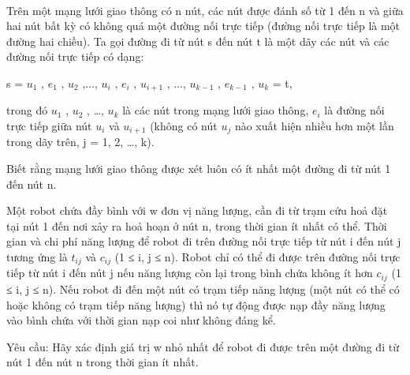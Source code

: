  

Trên một mạng lưới giao thông có n nút, các nút được đánh số từ 1 đến n và giữa hai nút bất kỳ có không quá một đường nối trực tiếp (đường nối trực tiếp là một đường hai chiều). Ta gọi đường đi từ nút s đến nút t là một dãy các nút và các đường nối trực tiếp có dạng:

s = $u_{1}$ , $e_{1}$ , $u_{2}$ ,..., $u_{i}$ , $e_{i}$ , $u_{i+1}$ , ..., $u_{k-1}$ , $e_{k-1}$ , $u_{k}$ = t,

trong đó $u_{1}$ , $u_{2}$ , …, $u_{k}$ là các nút trong mạng lưới giao thông, $e_{i}$ là đường nối trực tiếp giữa nút $u_{i}$ và $u_{i+1}$ (không có nút $u_{j}$ nào xuất hiện nhiều hơn một lần trong dãy trên, j = 1, 2, …, k).

Biết rằng mạng lưới giao thông được xét luôn có ít nhất một đường đi từ nút 1 đến nút n.

Một robot chứa đầy bình với w đơn vị năng lượng, cần đi từ trạm cứu hoả đặt tại nút 1 đến nơi xảy ra hoả hoạn ở nút n, trong thời gian ít nhất có thể. Thời gian và chi phí năng lượng để robot đi trên đường nối trực tiếp từ nút i đến nút j tương ứng là $t_{ij}$ và $c_{ij}$ (1 ≤ i, j ≤ n). Robot chỉ có thể đi được trên đường nối trực tiếp từ nút i đến nút j nếu năng lượng còn lại trong bình chứa không ít hơn $c_{ij}$ (1 ≤ i, j ≤ n). Nếu robot đi đến một nút có trạm tiếp năng lượng (một nút có thể có hoặc không có trạm tiếp năng lượng) thì nó tự động được nạp đầy năng lượng vào bình chứa với thời gian nạp coi như không đáng kể.

Yêu cầu: Hãy xác định giá trị w nhỏ nhất để robot đi được trên một đường đi từ nút 1 đến nút n trong thời gian ít nhất.